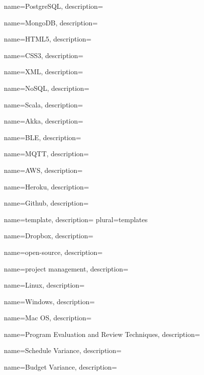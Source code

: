  {
	name=PostgreSQL,
	description={\TODO{}}
}

 {
	name=MongoDB,
	description={\TODO{}}
}

 {
	name=HTML5,
	description={\TODO{}}
}

 {
	name=CSS3,
	description={\TODO{}}
}

 {
	name=XML,
	description={\TODO{}}
}

 {
	name=NoSQL,
	description={\TODO{}}
}

 {
	name=Scala,
	description={\TODO{}}
}

 {
	name=Akka,
	description={\TODO{}}
}

 {
	name=BLE,
	description={\TODO{}}
}

 {
	name=MQTT,
	description={\TODO{}}
}

 {
	name=AWS,
	description={\TODO{}}
}

 {
	name=Heroku,
	description={\TODO{}}
}

 {
	name=Github,
	description={\TODO{}}
}

 {
	name=template,
	description={\TODO{}}
	plural=templates
}

 {
	name=Dropbox,
	description={\TODO{}}
}

 {
	name=open-source,
	description={\TODO{}}
}

 {
	name=project management,
	description={\TODO{}}
}

 {
	name=Linux,
	description={\TODO{}}
}

 {
	name=Windows,
	description={\TODO{}}
}

 {
	name=Mac OS,
	description={\TODO{}}
}

 {
	name=Program Evaluation and Review Techniques,
	description={\TODO{}}
}

 {
	name=Schedule Variance,
	description={\TODO{}}
}

 {
	name=Budget Variance,
	description={\TODO{}}
}


